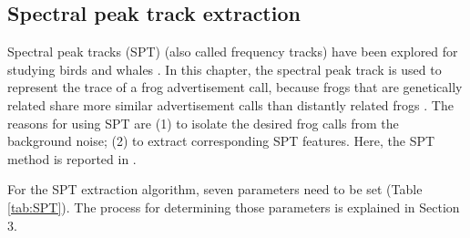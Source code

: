 %
%
%
 


\subsection{Spectral peak track extraction}
Spectral peak tracks (SPT) (also called frequency tracks) have been explored for studying birds \citep{birdTrack, jasaTrack} and whales \citep{roch2011automated}. In this chapter, the spectral peak track is used to represent the trace of a frog advertisement call, because frogs that are genetically related share more similar advertisement calls than distantly related frogs \citep{Gingras2013}. The reasons for using SPT are (1) to isolate the desired frog calls from the background noise; (2) to extract corresponding SPT features. Here, the SPT method is reported in \citep{Xie1504:Acoustic}. 

For the SPT extraction algorithm, seven parameters need to be set (Table \ref{tab:SPT}). The process for determining those parameters is explained in Section 3. 

